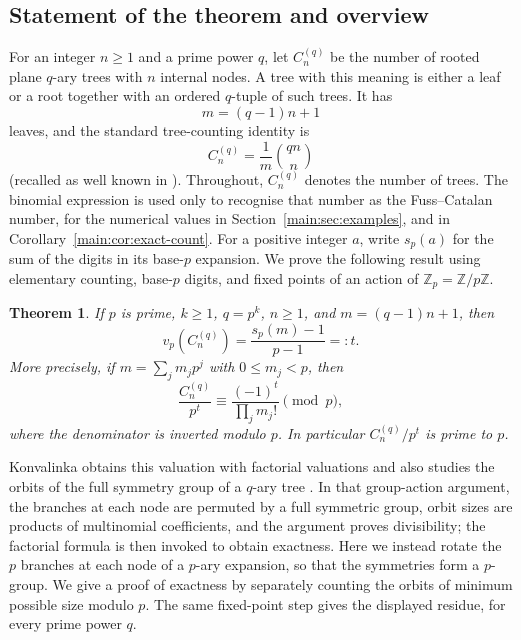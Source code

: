 \documentclass[11pt]{article}
\newtheorem{theorem}{Theorem}[section]
\theoremstyle{definition}
\theoremstyle{remark}
\numberwithin{equation}{section}
\numberwithin{figure}{section}
\newcommand{\Z}{\mathbb Z}
\newcommand{\fc}{C_n^{(q)}}
\begin{document}
\subsection{Statement of the theorem and overview}\label{main:sec:intro}
For an integer $n\ge 1$ and a prime power $q$, let $\fc$ be the number of rooted plane $q$-ary trees with $n$ internal nodes.  A tree with this meaning is either a leaf or a root together with an ordered $q$-tuple of such trees.  It has
\[
 m=(q-1)n+1
\]
leaves, and the standard tree-counting identity is
\[
 \fc=\frac1m\binom{qn}{n}
\]
(recalled as well known in \cite{Konvalinka}).  Throughout, $\fc$ denotes the number of trees.  The binomial expression is used only to recognise that number as the Fuss--Catalan number, for the numerical values in Section~\ref{main:sec:examples}, and in Corollary~\ref{main:cor:exact-count}.
For a positive integer $a$, write $s_p(a)$ for the sum of the digits in its base-$p$ expansion.  We prove the following result using elementary counting, base-$p$ digits, and fixed points of an action of $\Z_p=\Z/p\Z$.
\begin{theorem}\label{main:thm:main}
If $p$ is prime, $k\ge1$, $q=p^k$, $n\ge1$, and $m=(q-1)n+1$, then
\[
 v_p\!\left(\fc\right)=\frac{s_p(m)-1}{p-1}=:t.
\]
More precisely, if $m=\sum_jm_jp^j$ with $0\le m_j<p$, then
\[
 \frac{\fc}{p^t}\equiv \frac{(-1)^t}{\prod_jm_j!}
 \pmod p,
\]
where the denominator is inverted modulo $p$.  In particular $\fc/p^t$ is prime to $p$.
\end{theorem}
Konvalinka obtains this valuation with factorial valuations and also studies the orbits of the full symmetry group of a $q$-ary tree \cite{Konvalinka}.  In that group-action argument, the branches at each node are permuted by a full symmetric group, orbit sizes are products of multinomial coefficients, and the argument proves divisibility; the factorial formula is then invoked to obtain exactness.  Here we instead rotate the $p$ branches at each node of a $p$-ary expansion, so that the symmetries form a $p$-group.  We give a proof of exactness by separately counting the orbits of minimum possible size modulo $p$.  The same fixed-point step gives the displayed residue, for every prime power $q$.
\end{document}
